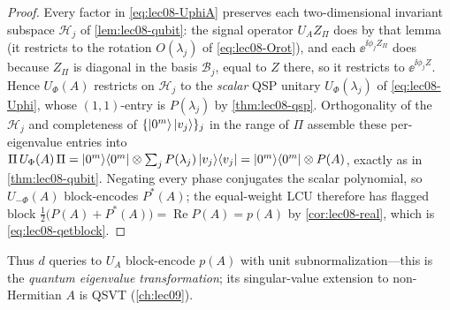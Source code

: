 \begin{proof}
Every factor in \eqref{eq:lec08-UphiA} preserves each two-dimensional invariant subspace
$\mathcal H_j$ of \cref{lem:lec08-qubit}: the signal operator $U_A Z_\Pi$ does by that
lemma (it restricts to the rotation $O(\lambda_j)$ of \eqref{eq:lec08-Orot}), and each
$\ee^{\ii\phi_j Z_\Pi}$ does because $Z_\Pi$ is diagonal in the basis $\mathcal B_j$,
equal to $Z$ there, so it restricts to $\ee^{\ii\phi_j Z}$. Hence $U_\Phi(A)$ restricts on
$\mathcal H_j$ to the \emph{scalar} QSP unitary $U_\Phi(\lambda_j)$ of
\eqref{eq:lec08-Uphi}, whose $(1,1)$-entry is $P(\lambda_j)$ by \cref{thm:lec08-qsp}.
Orthogonality of the $\mathcal H_j$ and completeness of $\{\ket{0^m}\ket{v_j}\}_j$ in the
range of $\Pi$ assemble these per-eigenvalue entries into
$\Pi\,U_\Phi(A)\,\Pi=\ket{0^m}\!\bra{0^m}\otimes\sum_j P(\lambda_j)\ket{v_j}\!\bra{v_j}
=\ket{0^m}\!\bra{0^m}\otimes P(A)$, exactly as in \cref{thm:lec08-qubit}. Negating every phase
conjugates the scalar polynomial, so $U_{-\Phi}(A)$ block-encodes $P^*(A)$; the
equal-weight LCU therefore has flagged block
$\tfrac12\bigl(P(A)+P^*(A)\bigr)=\operatorname{Re}P(A)=p(A)$ by \cref{cor:lec08-real},
which is \eqref{eq:lec08-qetblock}.
\end{proof}

Thus $d$ queries to $U_A$ block-encode $p(A)$ with unit subnormalization---this is the
\emph{quantum eigenvalue transformation}; its singular-value extension to non-Hermitian
$A$ is QSVT (\cref{ch:lec09}).

